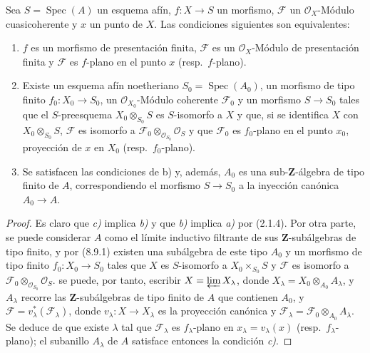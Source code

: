 \begin{corollary}[11.2.7]
\label{IV.11.2.7}
Sea $S=\operatorname{Spec}(A)$ un esquema afín, $f:X\to S$ un morfismo, $\mathcal F$ un $\mathcal O_X$-Módulo cuasicoherente y $x$ un punto de $X$. Las condiciones siguientes son equivalentes:
\begin{enumerate}[label=\emph{\alph*)}]
  \item $f$ es un morfismo de presentación finita, $\mathcal F$ es un $\mathcal O_X$-Módulo de presentación finita y $\mathcal F$ es $f$-plano en el punto $x$ (\textup{resp.}\ $f$-plano).
  \item Existe un esquema afín \textup{noetheriano} $S_0=\operatorname{Spec}(A_0)$, un morfismo de tipo finito $f_0:X_0\to S_0$, un $\mathcal O_{X_0}$-Módulo coherente $\mathcal F_0$ y un morfismo $S\to S_0$ tales que el $S$-preesquema $X_0\otimes_{S_0}S$ es $S$-isomorfo a $X$ y que, si se identifica $X$ con $X_0\otimes_{S_0}S$, $\mathcal F$ es isomorfo a $\mathcal F_0\otimes_{\mathcal O_{S_0}}\mathcal O_S$ y que $\mathcal F_0$ es $f_0$-plano en el punto $x_0$, proyección de $x$ en $X_0$ (\textup{resp.}\ $f_0$-plano).
  \item Se satisfacen las condiciones de \textup{b)} y, además, $A_0$ es una sub-$\mathbf Z$-álgebra de tipo finito de $A$, correspondiendo el morfismo $S\to S_0$ a la inyección canónica $A_0\to A$.
\end{enumerate}
\end{corollary}

\begin{proof}
Es claro que \emph{c)} implica \emph{b)} y que \emph{b)} implica \emph{a)} por
(2.1.4). Por otra parte, se puede considerar $A$ como el límite
inductivo filtrante de sus $\mathbf Z$-subálgebras de tipo finito, y por (8.9.1)
existen una subálgebra de este tipo $A_0$ y un morfismo de tipo finito
$f_0:X_0\to S_0$ tales que $X$ es
$S$-isomorfo a
$X_0\times_{S_0}S$ y $\mathcal F$ es isomorfo
a $\mathcal F_0\otimes_{\mathcal O_{S_0}}\mathcal O_S$. se puede, por tanto, escribir
$X=\varprojlim X_\lambda$, donde $X_\lambda=X_0\otimes_{A_0}A_\lambda$,
y $A_\lambda$ recorre las
$\mathbf Z$-subálgebras de tipo finito de $A$ que contienen $A_0$, y
$\mathcal F=v_\lambda^*(\mathcal F_\lambda)$, donde
$v_\lambda:X\to X_\lambda$ es la proyección canónica y
$\mathcal F_\lambda=\mathcal F_0\otimes_{A_0}A_\lambda$. Se
deduce de  que existe $\lambda$ tal que
$\mathcal F_\lambda$ es $f_\lambda$-plano en
$x_\lambda=v_\lambda(x)$ (resp.\ $f_\lambda$-plano); el subanillo
$A_\lambda$ de $A$ satisface entonces la condición \emph{c)}.
\end{proof}

